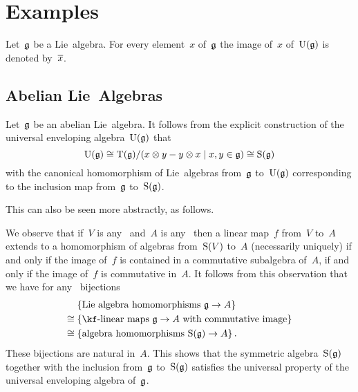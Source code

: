 \section{Examples}




\begin{convention}
  Let~$\mathfrak{g}$ be a Lie~algebra.
  For every element~$x$ of~$\mathfrak{g}$ the image of~$x$ of~$\operatorname{U}(\mathfrak{g})$ is denoted by~$\overline{x}$.
\end{convention}


\subsection{Abelian Lie~Algebras}


\begin{examples}
  Let~$\mathfrak{g}$ be an abelian Lie~algebra.
  It follows from the explicit construction of the universal enveloping algebra~$\operatorname{U}(\mathfrak{g})$ that
  \[
    \Univ(\glie)
    \cong
    \Tensor(\glie)/(x \tensor y - y \tensor x \suchthat x, y \in \glie)
    \cong
    \Symm(\glie)
  \]
  with the canonical homomorphism of Lie~algebras from~$\mathfrak{g}$ to~$\operatorname{U}(\mathfrak{g})$ corresponding to the inclusion map from~$\mathfrak{g}$ to~$\operatorname{S}(\mathfrak{g})$.

  This can also be seen more abstractly, as follows.
  
  We observe that if~$V$ is any~\vectorspace{$\kf$} and~$A$ is any~\algebra{$\kf$} then a linear map~$f$ from~$V$ to~$A$ extends to a homomorphism of algebras from~$\operatorname{S}(V)$ to~$A$ (necessarily uniquely) if and only if the image of~$f$ is contained in a commutative subalgebra of~$A$, if and only if the image of~$f$ is commutative in~$A$.
  It follows from this observation that we have for any~{\algebra{$\kf$}} bijections
  \begin{align*}
    {}&
    \{ \textstyle \text{Lie~algebra homomorphisms~$\glie \to A$} \}
    \\
    \cong{}&
    \{ \textstyle \text{{\linear{$\kf$}} maps~$\glie \to A$ with commutative image} \}
    \\
    \cong{}&
    \{ \textstyle \text{algebra homomorphisms~$\Symm(\glie) \to A$} \} \,.
  \end{align*}
  These bijections are natural in~$A$.
  This shows that the symmetric algebra~$\operatorname{S}(\mathfrak{g})$ together with the inclusion from~$\mathfrak{g}$ to~$\operatorname{S}(\mathfrak{g})$ satisfies the universal property of the universal enveloping algebra of~$\mathfrak{g}$.
\end{examples}



